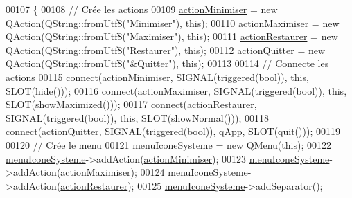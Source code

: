 \begin{DoxyCode}
00107 \{
00108     \textcolor{comment}{// Crée les actions}
00109     \hyperlink{class_ihm_groom_a4018ccf7f73329725e4c54002ae72f01}{actionMinimiser} = \textcolor{keyword}{new} QAction(QString::fromUtf8(\textcolor{stringliteral}{"Minimiser"}), \textcolor{keyword}{this});
00110     \hyperlink{class_ihm_groom_aa23dc46d5e223aa20bb84b5bd99d3b81}{actionMaximiser} = \textcolor{keyword}{new} QAction(QString::fromUtf8(\textcolor{stringliteral}{"Maximiser"}), \textcolor{keyword}{this});
00111     \hyperlink{class_ihm_groom_aa2df6badfa16f802411b502228fb8704}{actionRestaurer} = \textcolor{keyword}{new} QAction(QString::fromUtf8(\textcolor{stringliteral}{"Restaurer"}), \textcolor{keyword}{this});
00112     \hyperlink{class_ihm_groom_ab28c091688d25e93b2baf99b4aa90f07}{actionQuitter} = \textcolor{keyword}{new} QAction(QString::fromUtf8(\textcolor{stringliteral}{"&Quitter"}), \textcolor{keyword}{this});
00113 
00114     \textcolor{comment}{// Connecte les actions}
00115     connect(\hyperlink{class_ihm_groom_a4018ccf7f73329725e4c54002ae72f01}{actionMinimiser}, SIGNAL(triggered(\textcolor{keywordtype}{bool})), \textcolor{keyword}{this}, SLOT(hide()));
00116     connect(\hyperlink{class_ihm_groom_aa23dc46d5e223aa20bb84b5bd99d3b81}{actionMaximiser}, SIGNAL(triggered(\textcolor{keywordtype}{bool})), \textcolor{keyword}{this}, SLOT(showMaximized()));
00117     connect(\hyperlink{class_ihm_groom_aa2df6badfa16f802411b502228fb8704}{actionRestaurer}, SIGNAL(triggered(\textcolor{keywordtype}{bool})), \textcolor{keyword}{this}, SLOT(showNormal()));
00118     connect(\hyperlink{class_ihm_groom_ab28c091688d25e93b2baf99b4aa90f07}{actionQuitter}, SIGNAL(triggered(\textcolor{keywordtype}{bool})), qApp, SLOT(quit()));
00119 
00120     \textcolor{comment}{// Crée le menu}
00121     \hyperlink{class_ihm_groom_af2abf22a1a9203af547f32c7edb13710}{menuIconeSysteme} = \textcolor{keyword}{new} QMenu(\textcolor{keyword}{this});
00122     \hyperlink{class_ihm_groom_af2abf22a1a9203af547f32c7edb13710}{menuIconeSysteme}->addAction(\hyperlink{class_ihm_groom_a4018ccf7f73329725e4c54002ae72f01}{actionMinimiser});
00123     \hyperlink{class_ihm_groom_af2abf22a1a9203af547f32c7edb13710}{menuIconeSysteme}->addAction(\hyperlink{class_ihm_groom_aa23dc46d5e223aa20bb84b5bd99d3b81}{actionMaximiser});
00124     \hyperlink{class_ihm_groom_af2abf22a1a9203af547f32c7edb13710}{menuIconeSysteme}->addAction(\hyperlink{class_ihm_groom_aa2df6badfa16f802411b502228fb8704}{actionRestaurer});
00125     \hyperlink{class_ihm_groom_af2abf22a1a9203af547f32c7edb13710}{menuIconeSysteme}->addSeparator();

\end{DoxyCode}
